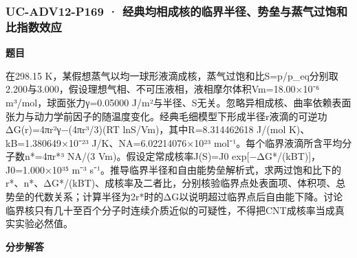 \documentclass[UTF8,11pt,a4paper]{ctexart}
\begin{document}
\subsubsection*{UC-ADV12-P169 · 经典均相成核的临界半径、势垒与蒸气过饱和比指数效应}
\noindent\textbf{题目}\par
在298.15 K，某假想蒸气以均一球形液滴成核，蒸气过饱和比S=p/p\_eq分别取2.200与3.000，假设理想气相、不可压液相，液相摩尔体积Vm=18.00×10⁻⁶ m³/mol，球面张力γ=0.05000 J/m²与半径、S无关。忽略异相成核、曲率依赖表面张力与动力学前因子的随温度变化。经典毛细模型下形成半径r液滴的可逆功ΔG(r)=4πr²γ−(4πr³/3)(RT lnS/Vm)，其中R=8.314462618 J/(mol K)、kB=1.380649×10⁻²³ J/K、NA=6.02214076×10²³ mol⁻¹。每个临界液滴所含平均分子数n*=4πr*³ NA/(3 Vm)。假设定常成核率J(S)=J0 exp[−ΔG*/(kBT)]，J0=1.000×10³⁵ m⁻³ s⁻¹。推导临界半径和自由能势垒解析式，求两过饱和比下的r*、n*、ΔG*/(kBT)、成核率及二者比，分别核验临界点处表面项、体积项、总势垒的代数关系；计算半径为2r*时的ΔG以说明超过临界点后自由能下降。讨论临界核只有几十至百个分子时连续介质近似的可疑性，不得把CNT成核率当成真实实验必然值。\par
\medskip\noindent\textbf{分步解答}
\end{document}
